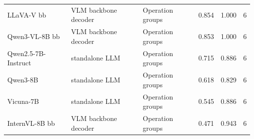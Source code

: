 \begin{table}[t]
\begin{tabular}{lllrrr}
LLaVA-V bb & VLM backbone decoder & Operation groups & 0.854 & 1.000 & 6 \\
Qwen3-VL-8B bb & VLM backbone decoder & Operation groups & 0.853 & 1.000 & 6 \\
Qwen2.5-7B-Instruct & standalone LLM & Operation groups & 0.715 & 0.886 & 6 \\
Qwen3-8B & standalone LLM & Operation groups & 0.618 & 0.829 & 6 \\
Vicuna-7B & standalone LLM & Operation groups & 0.545 & 0.886 & 6 \\
InternVL-8B bb & VLM backbone decoder & Operation groups & 0.471 & 0.943 & 6 \\
\bottomrule
\end{tabular}
\end{table}
